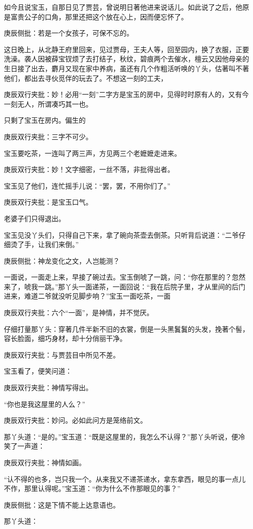 \begin{parag}


    如今且说宝玉，自那日见了贾芸，曾说明日著他进来说话儿。如此说了之后，他原是富贵公子的口角，那里还把这个放在心上，因而便忘怀了。\begin{note}庚辰侧批：若是一个女孩子，可保不忘的。\end{note}这日晚上，从北静王府里回来，见过贾母，王夫人等，回至园内，换了衣服，正要洗澡。袭人因被薛宝钗烦了去打结子，秋纹，碧痕两个去催水，檀云又因他母亲的生日接了出去，麝月又现在家中养病，虽还有几个作粗活听唤的丫头，估著叫不著他们，都出去寻伙觅伴的玩去了。不想这一刻的工夫，\begin{note}庚辰双行夹批：妙！必用“一刻”二字方是宝玉的房中，见得时时原有人的，又有今一刻无人，所谓凑巧其一也。\end{note}只剩了宝玉在房内。偏生的\begin{note}庚辰双行夹批：三字不可少。\end{note}宝玉要吃茶，一连叫了两三声，方见两三个老嬷嬷走进来。\begin{note}庚辰双行夹批：妙！文字细密，一丝不落，非批得出者。\end{note}宝玉见了他们，连忙摇手儿说：“罢，罢，不用你们了。”\begin{note}庚辰双行夹批：是宝玉口气。\end{note}老婆子们只得退出。
\end{parag}


\begin{parag}


    宝玉见没丫头们，只得自己下来，拿了碗向茶壶去倒茶。只听背后说道：“二爷仔细烫了手，让我们来倒。”\begin{note}庚辰侧批：神龙变化之文，人岂能测？\end{note}一面说，一面走上来，早接了碗过去。宝玉倒唬了一跳，问：“你在那里的？忽然来了，唬我一跳。”那丫头一面递茶，一面回说：“我在后院子里，才从里间的后门进来，难道二爷就没听见脚步响？”宝玉一面吃茶，一面\begin{note}庚辰双行夹批：六个“一面”，是神情，并不觉厌。\end{note}仔细打量那丫头：穿著几件半新不旧的衣裳，倒是一头黑鬒鬒的头发，挽著个髻，容长脸面，细巧身材，却十分俏丽干净。\begin{note}庚辰双行夹批：与贾芸目中所见不差。\end{note}宝玉看了，便笑问道：\begin{note}庚辰双行夹批：神情写得出。\end{note}“你也是我这屋里的人么？”\begin{note}庚辰双行夹批：妙问。必如此问方是笼络前文。\end{note}那丫头道：“是的。”宝玉道：“既是这屋里的，我怎么不认得？”那丫头听说，便冷笑了一声道：\begin{note}庚辰双行夹批：神情如画。\end{note}“认不得的也多，岂只我一个。从来我又不递茶递水，拿东拿西，眼见的事一点儿不作，那里认得呢。”宝玉道：“你为什么不作那眼见的事？”\begin{note}庚辰侧批：这是下情不能上达意语也。\end{note}那丫头道：
\end{parag}


